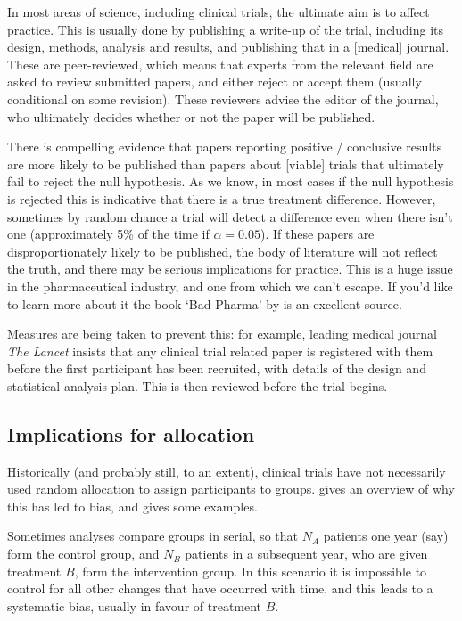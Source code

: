 \documentclass[
  openany]{book}
\theoremstyle{definition}
\theoremstyle{definition}
\theoremstyle{definition}
\theoremstyle{definition}
\theoremstyle{remark}
\begin{document}
In most areas of science, including clinical trials, the ultimate aim is to affect practice. This is usually done by publishing a write-up of the trial, including its design, methods, analysis and results, and publishing that in a {[}medical{]} journal. These are peer-reviewed, which means that experts from the relevant field are asked to review submitted papers, and either reject or accept them (usually conditional on some revision). These reviewers advise the editor of the journal, who ultimately decides whether or not the paper will be published.

There is compelling evidence that papers reporting positive / conclusive results are more likely to be published than papers about {[}viable{]} trials that ultimately fail to reject the null hypothesis. As we know, in most cases if the null hypothesis is rejected this is indicative that there is a true treatment difference. However, sometimes by random chance a trial will detect a difference even when there isn't one (approximately 5\% of the time if \(\alpha=0.05\)). If these papers are disproportionately likely to be published, the body of literature will not reflect the truth, and there may be serious implications for practice. This is a huge issue in the pharmaceutical industry, and one from which we can't escape. If you'd like to learn more about it the book `Bad Pharma' by \citet{goldacre2012bad} is an excellent source.

Measures are being taken to prevent this: for example, leading medical journal \emph{The Lancet} insists that any clinical trial related paper is registered with them before the first participant has been recruited, with details of the design and statistical analysis plan. This is then reviewed before the trial begins.

\subsection{Implications for allocation}\label{implications-for-allocation}

Historically (and probably still, to an extent), clinical trials have not necessarily used random allocation to assign participants to groups. \citet{altman1999treatment} gives an overview of why this has led to bias, and gives some examples.

Sometimes analyses compare groups in serial, so that \(N_A\) patients one year (say) form the control group, and \(N_B\) patients in a subsequent year, who are given treatment \(B\), form the intervention group. In this scenario it is impossible to control for all other changes that have occurred with time, and this leads to a systematic bias, usually in favour of treatment \(B\).
\end{document}
